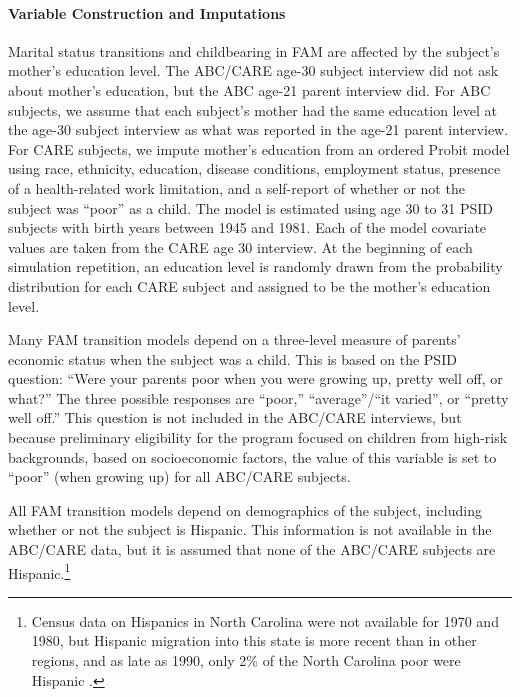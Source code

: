 \paragraph{Variable Construction and Imputations}
\label{section:FAM_ABC_impute}


\noindent Marital status transitions and childbearing in FAM are affected by the subject's mother's education level. The ABC/CARE age-30 subject interview did not ask about mother's education, but the ABC age-21 parent interview did.
For ABC subjects, we assume that each subject's mother had the same education level at the age-30 subject interview as what was reported in the age-21 parent interview. For CARE subjects, we impute mother's education from an ordered Probit model using race, ethnicity, education, disease conditions, employment status, presence of a health-related work limitation, and a self-report of whether or not the subject was ``poor'' as a child.  The model is estimated using age 30 to 31 PSID subjects with birth years between 1945 and 1981. Each of the model covariate values are taken from the CARE age 30 interview. At the beginning of each simulation repetition, an education level is randomly drawn from the probability distribution for each CARE subject and assigned to be the mother's education level.

\noindent Many FAM transition models depend on a three-level measure of parents' economic status when the subject was a child.
This is based on the PSID question: ``Were your parents poor when you were growing up, pretty well off, or what?''
The three possible responses are ``poor,'' ``average''/``it varied'', or ``pretty well off.''
This question is not included in the ABC/CARE interviews, but because preliminary eligibility for the program focused on children from high-risk backgrounds, based on socioeconomic factors, the value of this variable is set to ``poor'' (when growing up) for all ABC/CARE subjects.

\noindent All FAM transition models depend on demographics of the subject, including whether or not the subject is Hispanic.
This information is not available in the ABC/CARE data, but it is assumed that none of the ABC/CARE subjects are Hispanic.\footnote{Census data on Hispanics in North Carolina were not available for 1970 and 1980, but Hispanic migration into this state is more recent than in other regions, and as late as 1990, only 2\% of the North Carolina poor were Hispanic \citep{Johnson_2003_Changing-Poverty}.}

